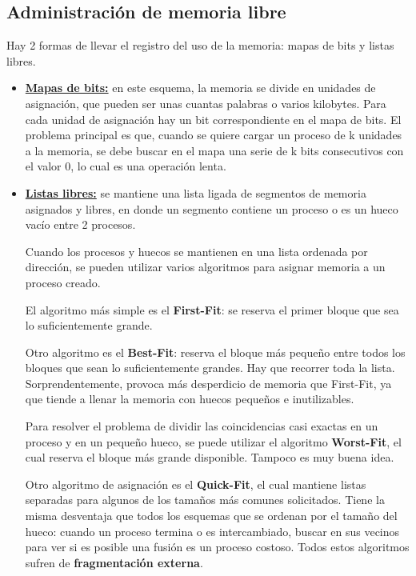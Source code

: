 \subsection{Administración de memoria libre}

Hay 2 formas de llevar el registro del uso de la memoria: mapas de bits y listas libres.

\begin{itemize}

\item \textbf{\underline{Mapas de bits:}} en este esquema, la memoria se divide en unidades de asignación, que pueden ser unas cuantas palabras o varios kilobytes. Para cada unidad de asignación hay un bit correspondiente en el mapa de bits. El problema principal es que, cuando se quiere cargar un proceso de k unidades a la memoria, se debe buscar en el mapa una serie de k bits consecutivos con el valor 0, lo cual es una operación lenta.

\item \textbf{\underline{Listas libres:}} se mantiene una lista ligada de segmentos de memoria asignados y libres, en donde un segmento contiene un proceso o es un hueco vacío entre 2 procesos.

Cuando los procesos y huecos se mantienen en una lista ordenada por dirección, se pueden utilizar varios algoritmos para asignar memoria a un proceso creado.

El algoritmo más simple es el \textbf{First-Fit}: se reserva el primer bloque que sea lo suficientemente grande.

Otro algoritmo es el \textbf{Best-Fit}: reserva el bloque más pequeño entre todos los bloques que sean lo suficientemente grandes. Hay que recorrer toda la lista. Sorprendentemente, provoca más desperdicio de memoria que First-Fit, ya que tiende a llenar la memoria con huecos pequeños e inutilizables.

Para resolver el problema de dividir las coincidencias casi exactas en un proceso y en un pequeño hueco, se puede utilizar el algoritmo \textbf{Worst-Fit}, el cual reserva el bloque más grande disponible. Tampoco es muy buena idea.

Otro algoritmo de asignación es el \textbf{Quick-Fit}, el cual mantiene listas separadas para algunos de los tamaños más comunes solicitados. Tiene la misma desventaja que todos los esquemas que se ordenan por el tamaño del hueco: cuando un proceso termina o es intercambiado, buscar en sus vecinos para ver si es posible una fusión es un proceso costoso. Todos estos algoritmos sufren de \textbf{fragmentación externa}.

\end{itemize}


